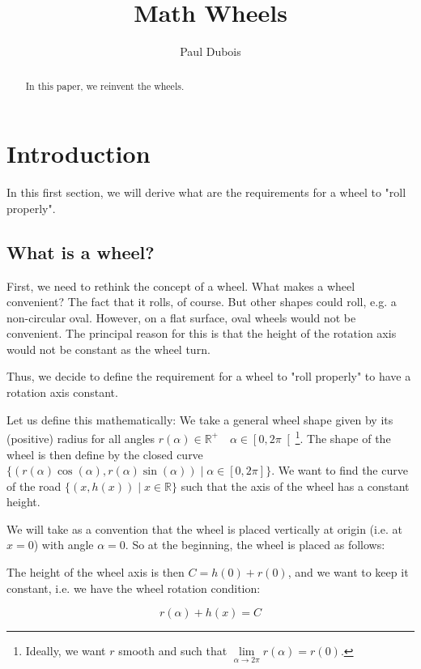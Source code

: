 \documentclass[]{article}
\title{Math Wheels}
\author{Paul Dubois}
\newcommand{\R}{\mathbb{R}}
\begin{document}
	
	\maketitle
	
	\begin{abstract}
		In this paper, we reinvent the wheels.
	\end{abstract}
	
	\section{Introduction}
	In this first section, we will derive what are the requirements for a wheel to "roll properly".
	
	\subsection{What is a wheel?}
	First, we need to rethink the concept of a wheel.
	What makes a wheel convenient? The fact that it rolls, of course. But other shapes could roll, e.g. a non-circular oval.
	However, on a flat surface, oval wheels would not be convenient.
	The principal reason for this is that the height of the rotation axis would not be constant as the wheel turn.
	
	Thus, we decide to define the requirement for a wheel to "roll properly" to have a rotation axis constant.
	
	Let us define this mathematically:
	We take a general wheel shape given by its (positive) radius for all angles $r(\alpha) \in \R^+ \quad \alpha \in \left[ 0, 2\pi \right[$\footnote{Ideally, we want $r$ smooth and such that $\lim\limits_{\alpha \to 2\pi} r(\alpha)=r(0)$.}.
	The shape of the wheel is then define by the closed curve $\{ (r(\alpha)\cos(\alpha),r(\alpha)\sin(\alpha)) \mid \alpha \in \left[ 0,2\pi \right] \}$.
	We want to find the curve of the road $\{ (x,h(x)) \mid x \in \R \}$ such that the axis of the wheel has a constant height.
	
	We will take as a convention that the wheel is placed vertically at origin (i.e. at $x=0$) with angle $\alpha=0$.
	So at the beginning, the wheel is placed as follows:
	
	
	The height of the wheel axis is then $C = h(0)+r(0)$, and we want to keep it constant, i.e. we have the wheel rotation condition:
	
	\begin{equation}
		\tag{Wheel Rotation Condition}
		r(\alpha)+h(x)=C
		\label{eqn:WheelRotationCondition}
	\end{equation}
	
\end{document}
